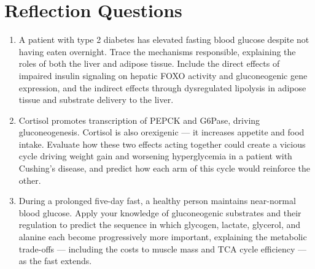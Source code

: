 \documentclass{tufte-handout}
\begin{document}
\section{Reflection Questions}
\begin{enumerate}
\item A patient with type 2 diabetes has elevated fasting blood glucose despite not having eaten overnight. Trace the mechanisms responsible, explaining the roles of both the liver and adipose tissue. Include the direct effects of impaired insulin signaling on hepatic FOXO activity and gluconeogenic gene expression, and the indirect effects through dysregulated lipolysis in adipose tissue and substrate delivery to the liver.
\item Cortisol promotes transcription of PEPCK and G6Pase, driving gluconeogenesis. Cortisol is also orexigenic --- it increases appetite and food intake. Evaluate how these two effects acting together could create a vicious cycle driving weight gain and worsening hyperglycemia in a patient with Cushing's disease, and predict how each arm of this cycle would reinforce the other.
\item During a prolonged five-day fast, a healthy person maintains near-normal blood glucose. Apply your knowledge of gluconeogenic substrates and their regulation to predict the sequence in which glycogen, lactate, glycerol, and alanine each become progressively more important, explaining the metabolic trade-offs --- including the costs to muscle mass and TCA cycle efficiency --- as the fast extends.
\end{enumerate}
\end{document}
